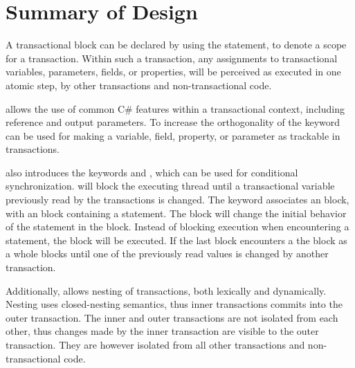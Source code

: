 \section{Summary of Design}\label{sec:summary_design}
A transactional block can be declared by using the  statement, to denote a scope for a transaction. Within such a transaction, any assignments to transactional variables, parameters, fields, or properties, will be perceived as executed in one atomic step, by other transactions and non-transactional code.

\stmname allows the use of common C\# features within a transactional context, including reference and output parameters. To increase the orthogonality of \stmname the  keyword can be used for making a variable, field, property, or parameter as trackable in transactions.

\stmnamesp also introduces the keywords  and , which can be used for conditional synchronization.  will block the executing thread until a transactional variable previously read by the transactions is changed. The  keyword associates an  block, with an  block containing a  statement. The  block will change the initial behavior of the  statement in the  block. Instead of blocking execution when encountering a  statement, the  block will be executed. If the last  block encounters a  the  block as a whole blocks until one of the previously read values is changed by another transaction.

Additionally, \stmnamesp allows nesting of transactions, both lexically and dynamically. Nesting uses closed-nesting semantics, thus inner transactions commits into the outer transaction. The inner and outer transactions are not isolated from each other, thus changes made by the inner transaction are visible to the outer transaction. They are however isolated from all other transactions and non-transactional code.


%
%
%
%   
%
%   
       
       

\worksheetend